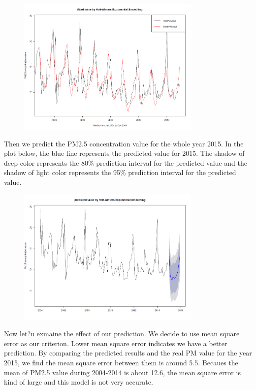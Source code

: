 \documentclass[10pt]{article}
\begin{document}
\begin{figure}[ht!]
\centering
\includegraphics[width = 90mm]{ts2.png}
\end{figure}

Then we predict the PM2.5 concentration value for the whole year 2015. In the plot below, the blue line represents the predicted value for 2015. The shadow of deep color represents the 80\% prediction interval for the predicted value and the shadow of light color represents the 95\% prediction interval for the predicted value.

\begin{figure}[ht!]
\centering
\includegraphics[width = 90mm]{ts3.png}
\end{figure}

Now let?u exmaine the effect of our prediction. We decide to use mean square error as our criterion. Lower mean square error indicates we have a better prediction. By comparing the predicted results and the real PM value for the year 2015, we find the mean square error between them is around 5.5. Becaues the mean of PM2.5 value during 2004-2014 is about 12.6, the mean square error is kind of large and this model is not very accurate.
\end{document}
